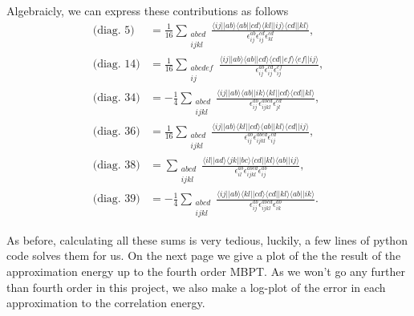 \documentclass[a4paper, 11pt, notitlepage, english]{article}
\newcommand{\brakket}[2]{\langle #1 || #2 \rangle}
\newcommand{\eps}{\epsilon}
\begin{document}
Algebraicly, we can express these contributions as follows
\begin{align*}
\mbox{(diag.\ 5)} &= \frac{1}{16}\sum_{\substack{abcd \\ ijkl}} 
\frac{\brakket{ij}{ab}\brakket{ab}{cd}\brakket{kl}{ij}\brakket{cd}{kl}}{\eps_{ij}^{ab}\eps_{ij}^{cd}\eps_{kl}^{cd}}, \\[0.2cm]
%
%
\mbox{(diag.\ 14)} &= \frac{1}{16}\sum_{\substack{abcdef \\ ij}} 
\frac{\brakket{ij}{ab}\brakket{ab}{cd}\brakket{cd}{ef}\brakket{ef}{ij}}{\eps_{ij}^{ab}\eps_{ij}^{cd}\eps_{ij}^{ef}}, \\[0.2cm]
%
%
\mbox{(diag.\ 34)} &= -\frac{1}{4}\sum_{\substack{abcd \\ ijkl}} 
\frac{\brakket{ij}{ab}\brakket{ab}{ik}\brakket{kl}{cd}\brakket{cd}{kl}}
{\eps_{ij}^{ab}\eps_{ijkl}^{abcd}\eps_{jl}^{cd}}, \\[0.2cm]
%
%
\mbox{(diag.\ 36)} &= \frac{1}{16}\sum_{\substack{abcd \\ ijkl}} 
\frac{\brakket{ij}{ab}\brakket{kl}{cd}\brakket{ab}{kl}\brakket{cd}{ij}}
{\eps_{ij}^{ab}\eps_{ijkl}^{abcd}\eps_{ij}^{cd}}, \\[0.2cm]
%
%
\mbox{(diag.\ 38)} &= \sum_{\substack{abcd \\ ijkl}} 
\frac{\brakket{il}{ad}\brakket{jk}{bc}\brakket{cd}{kl}\brakket{ab}{ij}}
{\eps_{il}^{ab}\eps_{ijkl}^{abcd}\eps_{ij}^{ab}}, \\[0.2cm]
%
%
\mbox{(diag.\ 39)} &= -\frac{1}{4}\sum_{\substack{abcd \\ ijkl}} 
\frac{\brakket{ij}{ab}\brakket{kl}{cd}\brakket{cd}{kl}\brakket{ab}{ik}}
{\eps_{ij}^{ab}\eps_{ijkl}^{abcd}\eps_{ik}^{ab}}.
\end{align*}

As before, calculating all these sums is very tedious, luckily, a few lines of python code solves them for us. On the next page we give a plot of the the result of the approximation energy up to the fourth order MBPT. As we won't go any further than fourth order in this project, we also make a log-plot of the error in each approximation to the correlation energy.
\end{document}
